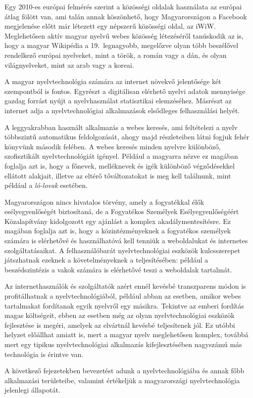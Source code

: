 \begin{multicols}{2}

  Egy 2010-es európai felmérés szerint a közösségi oldalak használata az európai átlag fölött van, ami talán annak köszönhető, hogy Magyarországon a Facebook megjelenése előtt már létezett egy népszerű közösségi oldal, az iWiW. Meglehetősen aktív magyar nyelvű webes közösség létezéséről tanúskodik az is, hogy a magyar Wikipédia a 19.\ leg\-na\-gyobb, megelőzve olyan több beszélővel rendelkező európai nyelveket, mint a török, a román vagy a dán, és olyan világnyelveket, mint az arab vagy a koreai. 

  A magyar nyelvtechnológia számára az internet növekvő jelentősége két szempontból is fontos. Egyrészt a digitálisan elérhető nyelvi adatok mennyisége gazdag forrást nyújt a nyelvhasználat statisztikai elemzéséhez. Másrészt az internet adja a nyelvtechnológiai alkalmazások elsődleges felhasználási helyét. 

  A leggyakrabban használt alkalmazás a webes keresés, ami feltételezi a nyelv többszintű automatikus feldolgozását, a\-hogy majd részleteiben látni fogjuk fehér könyvünk második felében. A webes keresés minden nyelvre különböző, szo\-fisz\-ti\-kált nyelvtechnológiát igényel. Például a magyarra nézve ez magában foglalja azt is, hogy a főnevek, melléknevek és igék különböző végződésekkel ellátott alakjait, illetve az eltérő tőváltozatokat is meg kell találnunk, mint például a \textit{ló-lovak} ese\-té\-ben.  

  Magyarországon nincs hivatalos törvény, amely a fogyatékkal élők esélyegyenlőségét biztosítaná, de a Fogyatékos Személyek Esélyegyenlőségéért Közalapítvány kidolgozott egy ajánlást a komplex akadálymentesítésre. Ez magában foglalja azt is, hogy a közintézményeknek a fo\-gya\-té\-kos személyek számára is elérhetővé és használhatóvá kell tenniük a weboldalukat és internetes szolgáltatásaikat. A felhasználóbarát nyelvtechnológiai eszközök kulcsszerepet játszhatnak ezeknek a kö\-ve\-tel\-mé\-nyek\-nek a teljesítésében: például a beszédszintézis a vakok számára is elérhetővé teszi a weboldalak tartalmát.   

  Az internethasználók és szolgáltatók azért ennél kevésbé transzparens módon is pro\-fi\-tál\-hat\-nak a nyelvtechnológiából, például abban az esetben, amikor webes tartalmakat fordítanak egyik nyelvről egy másikra. Tekintve az emberi fordítás magas költségeit, ebben az esetben még az olyan nyelvtechnológiai eszközök fej\-lesz\-té\-se is megéri, amelyek az elvártnál kevésbé teljesítenek jól. Ez utóbbi helyzet előállhat amiatt is, mert a magyar nyelv meglehetősen komplex, továbbá mert egy tipikus nyelvtechnológiai alkalmazás ki\-fej\-lesz\-té\-sé\-ben nagyszámú más technológia is érintve van.

  A következő fejezetekben bevezetést adunk a nyelvtechnológiába és annak főbb al\-kal\-ma\-zá\-si területeibe, valamint értékeljük a magyarországi nyelvtechnológia jelenlegi állapotát.

  \end{multicols}

